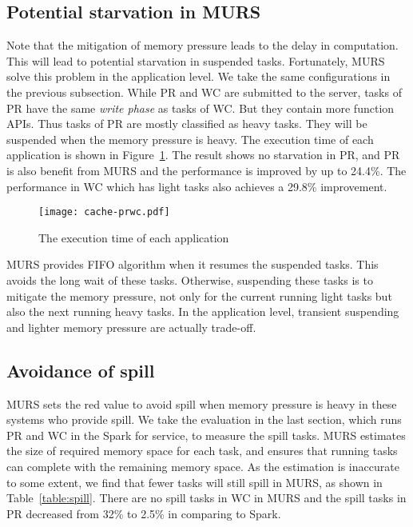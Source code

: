 \subsection{Potential starvation in MURS}

Note that the mitigation of memory pressure leads to the delay in computation. This will lead to potential starvation in suspended tasks. Fortunately, MURS solve this problem in the application level. We take the same configurations in the previous subsection. While PR and WC are submitted to the server, tasks of PR have the same \textit{write phase} as tasks of WC. But they contain more function APIs. Thus tasks of PR are mostly classified as heavy tasks. They will be suspended when the memory pressure is heavy. The execution time of each application is shown in Figure~\ref{fig:cache-prwc}. The result shows no starvation in PR, and PR is also benefit from MURS and the performance is improved by up to 24.4\%. The performance in WC which has light tasks also achieves a 29.8\% improvement. 

\begin{figure}[!t]
\centering
\texttt{[image: cache-prwc.pdf]}
\caption{The execution time of each application}
\label{fig:cache-prwc}
\end{figure}

MURS provides FIFO algorithm when it resumes the suspended tasks. This avoids the long wait of these tasks. Otherwise, suspending these tasks is to mitigate the memory pressure, not only for the current running light tasks but also the next running heavy tasks. In the application level, transient suspending and lighter memory pressure are actually trade-off. 

\subsection{Avoidance of spill}

MURS sets the red value to avoid spill when memory pressure is heavy in these systems who provide spill. We take the evaluation in the last section, which runs PR and WC in the Spark for service, to measure the spill tasks. MURS estimates the size of required memory space for each task, and ensures that running tasks can complete with the remaining memory space. As the estimation is inaccurate to some extent, we find that fewer tasks will still spill in MURS, as shown in Table~\ref{table:spill}. There are no spill tasks in WC in MURS and the spill tasks in PR decreased from 32\% to 2.5\% in comparing to Spark.

